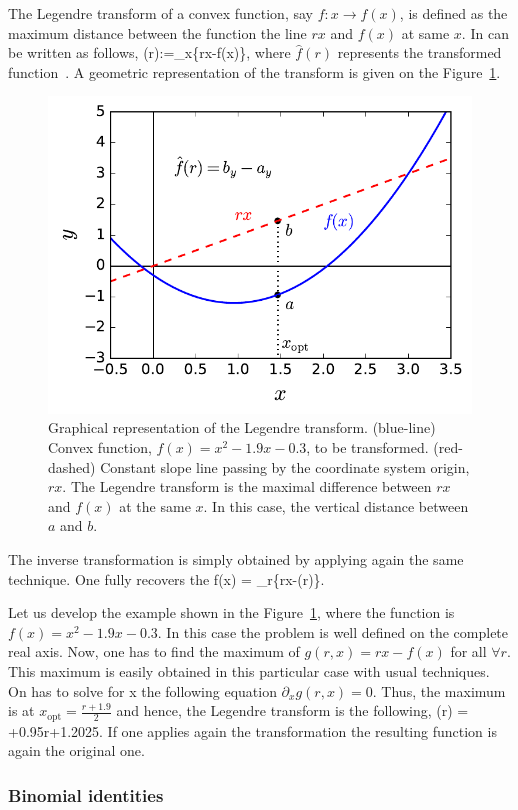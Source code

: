 The Legendre transform of a convex function, say $f:x \rightarrow f(x)$, is defined as the maximum distance between the function the line $rx$ and $f(x)$ at same $x$.
In can be written as follows,
\be
  (r):=\max_{x}\{rx-f(x)\},
\ee
where $\hat{f}(r)$ represents the transformed function~\citep{Rockafellar1996}.
A geometric representation of the transform is given on the Figure~\ref{fig:lt-geometric-legendre}.

\begin{figure}
  \centering
  \includegraphics[scale=.65]{img/plots/LT_legendre.pdf}
  \caption{Graphical representation of the Legendre transform. (blue-line) Convex function, $f(x)=x^2-1.9x-0.3$, to be transformed. (red-dashed) Constant slope line passing by the coordinate system origin, $rx$. The Legendre transform is the maximal difference between $rx$ and $f(x)$ at the same $x$. In this case, the vertical distance between $a$ and $b$.}
  \label{fig:lt-geometric-legendre}
\end{figure}

The inverse transformation is simply obtained by applying again the same technique.
One fully recovers the
\be
  f(x) = \max_{r}\{rx-(r)\}.
\ee

Let us develop the example shown in the Figure~\ref{fig:lt-geometric-legendre}, where the function is $f(x)=x^2-1.9x-0.3$.
In this case the problem is well defined on the complete real axis.
Now, one has to find the maximum of $g(r,x)=rx-f(x)$ for all $\forall r$.
This maximum is easily obtained in this particular case with usual techniques.
On has to solve for x the following equation $\partial_x g(r,x) = 0$. Thus, the maximum is at $x_{\text{opt}} = \frac{r+1.9}{2}$ and hence, the Legendre transform is the following,
\be
  (r) = +0.95r+1.2025.
\ee
If one applies again the transformation the resulting function is again the original one.

\subsubsection{Binomial identities}
